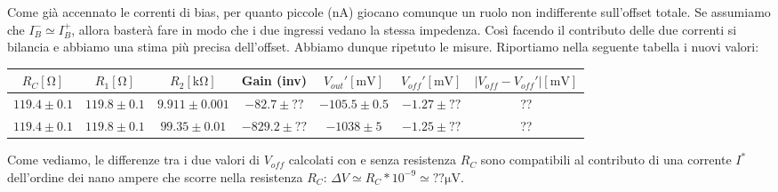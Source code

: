 Come già accennato le correnti di bias, per quanto piccole (\si{\nano\ampere}) giocano comunque un ruolo non indifferente sull'offset totale. Se assumiamo che $I_B^- \simeq I_B^+ $, allora basterà fare in modo che i due ingressi vedano la stessa impedenza. Così facendo il contributo delle due correnti si bilancia e abbiamo una stima più precisa dell'offset. Abbiamo dunque ripetuto le misure. Riportiamo nella seguente tabella i nuovi valori:



\begin{tabular}{c|c|c|c|c|c|c}
$R_C [\si{\ohm}]$& $R_1[\si{\ohm}]$ & $R_2[\si{\kilo\ohm}]$ & Gain (inv) & $V_{out}' [\si{\milli\volt}]$ & $V_{off}' [\si{\milli\volt}]$ & $|V_{off}-V_{off}'|[\si{\milli\volt}]$ \\ 
\hline 
$119.4\pm0.1$ & $119.8\pm0.1$ & $9.911\pm0.001$  & $-82.7\pm??$ & $-105.5 \pm 0.5$ & $-1.27 \pm??$ & ?? \\
\hline
$119.4\pm0.1$ & $119.8\pm0.1$ & $99.35\pm0.01$  & $-829.2\pm??$ &$ -1038 \pm 5$ & $-1.25 \pm ??$ & ?? 	\\

\end{tabular}

Come vediamo, le differenze tra i due valori di $V_{off}$ calcolati con e senza resistenza $R_C$ sono compatibili al contributo di una corrente $I^*$ dell'ordine dei nano ampere che scorre nella resistenza $R_C$: $\Delta V \simeq R_C * 10^{-9} \simeq ?? \si{\micro\volt}$.

















































































